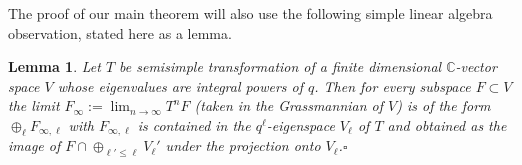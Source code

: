 \documentclass[12pt,letterpaper]{amsart}
\numberwithin{equation}{section}
\def\CC{{\mathbb C}}
\newtheorem{lemma}[theorem]{Lemma}
\theoremstyle{remark}
\begin{document}
The proof of  our main theorem will also use the following simple linear algebra observation, stated here as a lemma.

\begin{lemma}\label{lemma:grassmannlimit}
Let  $T$ be  semisimple transformation of a finite dimensional $\CC$-vector space $V$ whose eigenvalues are integral powers of $q$. Then for every subspace  $F\subset V$  the limit $F_\infty:=\lim_{n\to \infty} T^nF$ (taken in the Grassmannian of $V$) is of the form
$\oplus_\ell F_{\infty, \ell}$ with $F_{\infty, \ell}$ is contained in the $q^\ell$-eigenspace $V_\ell$ of $T$ and obtained  
as  the image of  $F\cap \oplus_{\ell'\le \ell} V_\ell'$ under the projection onto $V_\ell$.\hfill $\square$
\end{lemma}
\end{document}
